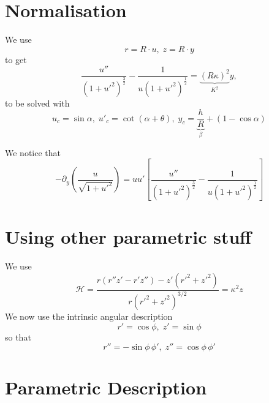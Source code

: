 \documentclass[aps,onecolumn]{revtex4}
\begin{document}
\section{Normalisation}
We use
\begin{equation}
	r = R\cdot u,\; z = R \cdot y
\end{equation}
to get
\begin{equation}
	\dfrac{u''}{\left(1+{u'}^2\right)^{\frac{3}{2}}} - \dfrac{1}{u\left(1+{u'}^2\right)^{\frac{1}{2}}} = \underbrace{\left(R\kappa\right)^2}_{K^2} y,
\end{equation}
to be solved with
\begin{equation}
	u_c = \sin\alpha, \; u'_c = \cot\left(\alpha+\theta\right), \; y_c = \underbrace{\dfrac{h}{R}}_{\beta} + \left(1-\cos\alpha\right)
\end{equation}

We notice that
\begin{equation}
	- \partial_y \left(\dfrac{u}{\sqrt{1+{u'}^2}}\right) = u u' \left[ \dfrac{u''}{\left(1+{u'}^2\right)^{\frac{3}{2}}} - \dfrac{1}{u\left(1+{u'}^2\right)^{\frac{1}{2}}} \right]
\end{equation}


\section{Using other parametric stuff}
We use
\begin{equation}
	\mathcal{H} =  \dfrac{
		r \left(r''z'-r'z''\right)  - z' \left(r'^2+z'^2\right)
	}
	{
		r\left(r'^2+z'^2\right)^{3/2}
	} = \kappa^2 z
\end{equation}
We now use the intrinsic angular description 
\begin{equation}
	r' = \cos \phi,\; z' = \sin \phi
\end{equation}
so that
\begin{equation}
	r'' = -\sin \phi\, \phi',\; z'' = \cos \phi \, \phi'
\end{equation}



\section{Parametric Description}
\end{document}
